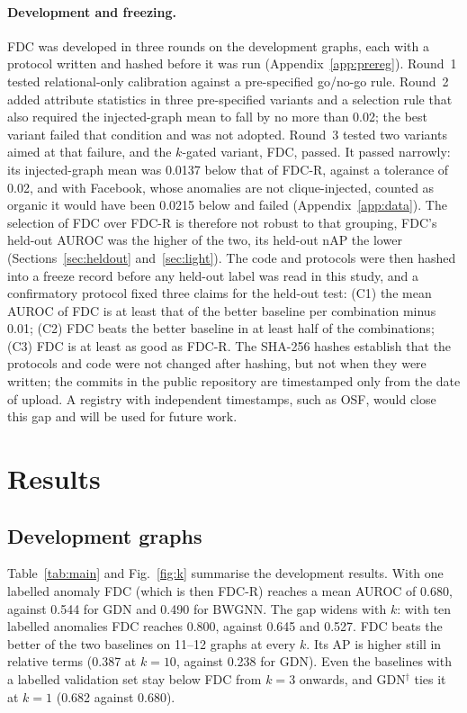 \documentclass[pdflatex,sn-mathphys-ay]{sn-jnl}
\theoremstyle{plain}
\theoremstyle{remark}
\begin{document}
\paragraph{Development and freezing.} FDC was developed in three rounds on the development graphs, each with a protocol written and hashed before it was run (Appendix~\ref{app:prereg}). Round~1 tested relational-only calibration against a pre-specified go/no-go rule. Round~2 added attribute statistics in three pre-specified variants and a selection rule that also required the injected-graph mean to fall by no more than 0.02; the best variant failed that condition and was not adopted. Round~3 tested two variants aimed at that failure, and the $k$-gated variant, FDC, passed. It passed narrowly: its injected-graph mean was 0.0137 below that of FDC-R, against a tolerance of 0.02, and with Facebook, whose anomalies are not clique-injected, counted as organic it would have been 0.0215 below and failed (Appendix~\ref{app:data}). The selection of FDC over FDC-R is therefore not robust to that grouping, FDC's held-out AUROC was the higher of the two, its held-out nAP the lower (Sections~\ref{sec:heldout} and~\ref{sec:light}). The code and protocols were then hashed into a freeze record before any held-out label was read in this study, and a confirmatory protocol fixed three claims for the held-out test: (C1) the mean AUROC of FDC is at least that of the better baseline per combination minus 0.01; (C2) FDC beats the better baseline in at least half of the combinations; (C3) FDC is at least as good as FDC-R. The SHA-256 hashes establish that the protocols and code were not changed after hashing, but not when they were written; the commits in the public repository are timestamped only from the date of upload. A registry with independent timestamps, such as OSF, would close this gap and will be used for future work.

\section{Results}\label{sec:results}

\subsection{Development graphs}\label{sec:devres}

Table~\ref{tab:main} and Fig.~\ref{fig:k} summarise the development results. With one labelled anomaly FDC (which is then FDC-R) reaches a mean AUROC of 0.680, against 0.544 for GDN and 0.490 for BWGNN. The gap widens with $k$: with ten labelled anomalies FDC reaches 0.800, against 0.645 and 0.527. FDC beats the better of the two baselines on 11--12 graphs at every $k$. Its AP is higher still in relative terms (0.387 at $k=10$, against 0.238 for GDN). Even the baselines with a labelled validation set stay below FDC from $k=3$ onwards, and GDN$^{\dagger}$ ties it at $k=1$ (0.682 against 0.680).
\end{document}
